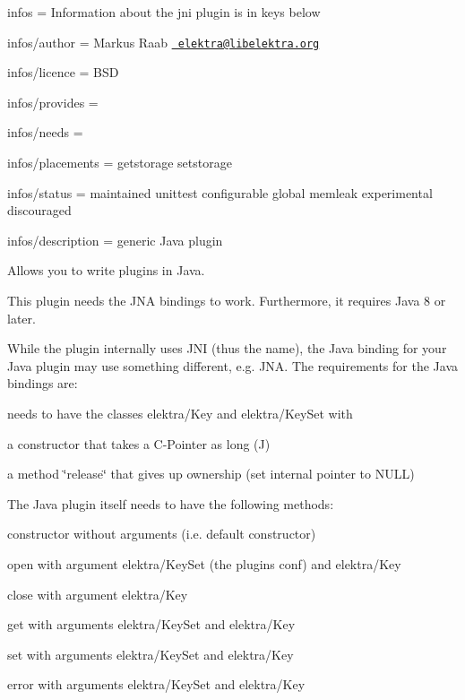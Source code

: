 
\begin{DoxyItemize}
\item infos = Information about the jni plugin is in keys below
\item infos/author = Markus Raab \href{mailto:elektra@libelektra.org}{\texttt{ elektra@libelektra.\+org}}
\item infos/licence = B\+SD
\item infos/provides =
\item infos/needs =
\item infos/placements = getstorage setstorage
\item infos/status = maintained unittest configurable global memleak experimental discouraged
\item infos/description = generic Java plugin
\end{DoxyItemize}

Allows you to write plugins in Java.

This plugin needs the J\+NA bindings to work. Furthermore, it requires Java 8 or later.

While the plugin internally uses J\+NI (thus the name), the Java binding for your Java plugin may use something different, e.\+g. J\+NA. The requirements for the Java bindings are\+:


\begin{DoxyItemize}
\item needs to have the classes {\ttfamily elektra/\+Key} and {\ttfamily elektra/\+Key\+Set} with
\begin{DoxyItemize}
\item a constructor that takes a C-\/\+Pointer as long (J)
\item a method \char`\"{}release\char`\"{} that gives up ownership (set internal pointer to N\+U\+LL)
\end{DoxyItemize}
\end{DoxyItemize}

The Java plugin itself needs to have the following methods\+:


\begin{DoxyItemize}
\item constructor without arguments (i.\+e. default constructor)
\item open with argument {\ttfamily elektra/\+Key\+Set} (the plugin\textquotesingle{}s conf) and {\ttfamily elektra/\+Key}
\item close with argument {\ttfamily elektra/\+Key}
\item get with arguments {\ttfamily elektra/\+Key\+Set} and {\ttfamily elektra/\+Key}
\item set with arguments {\ttfamily elektra/\+Key\+Set} and {\ttfamily elektra/\+Key}
\item error with arguments {\ttfamily elektra/\+Key\+Set} and {\ttfamily elektra/\+Key}
\end{DoxyItemize}

